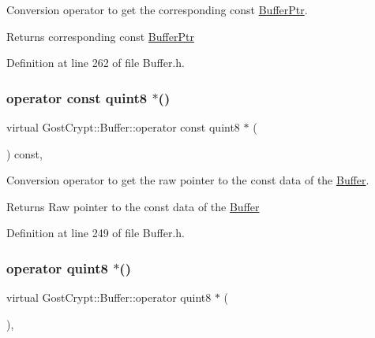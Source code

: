 Conversion operator to get the corresponding const \hyperlink{class_gost_crypt_1_1_buffer_ptr}{Buffer\+Ptr}. 

\begin{DoxyReturn}{Returns}
corresponding const \hyperlink{class_gost_crypt_1_1_buffer_ptr}{Buffer\+Ptr} 
\end{DoxyReturn}


Definition at line 262 of file Buffer.\+h.

\mbox{\label{class_gost_crypt_1_1_buffer_a025beb50a8f31598c8139af58911af34}} 
\subsubsection{\texorpdfstring{operator const quint8 $\ast$()}{operator const quint8 *()}}
{\footnotesize\ttfamily virtual Gost\+Crypt\+::\+Buffer\+::operator const quint8 $\ast$ (\begin{DoxyParamCaption}{ }\end{DoxyParamCaption}) const\hspace{0.3cm}{\ttfamily [inline]}, {\ttfamily [virtual]}}



Conversion operator to get the raw pointer to the const data of the \hyperlink{class_gost_crypt_1_1_buffer}{Buffer}. 

\begin{DoxyReturn}{Returns}
Raw pointer to the const data of the \hyperlink{class_gost_crypt_1_1_buffer}{Buffer} 
\end{DoxyReturn}


Definition at line 249 of file Buffer.\+h.

\mbox{\label{class_gost_crypt_1_1_buffer_a3f1a73b8d61efa1469adea03408f837d}} 
\subsubsection{\texorpdfstring{operator quint8 $\ast$()}{operator quint8 *()}}
{\footnotesize\ttfamily virtual Gost\+Crypt\+::\+Buffer\+::operator quint8 $\ast$ (\begin{DoxyParamCaption}{ }\end{DoxyParamCaption})\hspace{0.3cm}{\ttfamily [inline]}, {\ttfamily [virtual]}}



